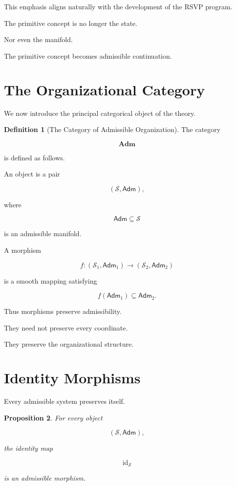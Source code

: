 \documentclass[11pt,oneside]{book}
\numberwithin{equation}{chapter}
\theoremstyle{definition}
\newtheorem{definition}{Definition}[chapter]
\theoremstyle{plain}
\newtheorem{proposition}[definition]{Proposition}
\DeclareMathOperator{\id}{id}
\newcommand{\State}{\mathcal{S}}
\newcommand{\Adm}{\mathsf{Adm}}
\begin{document}
This emphasis aligns naturally with the development of the RSVP program.

The primitive concept is no longer the state.

Nor even the manifold.

The primitive concept becomes admissible continuation.

\section{The Organizational Category}

We now introduce the principal categorical object of the theory.

\begin{definition}[The Category of Admissible Organization]

The category

\[
\mathbf{Adm}
\]

is defined as follows.

An object is a pair

\[
(\State,\Adm),
\]

where

\[
\Adm
\subseteq
\State
\]

is an admissible manifold.

A morphism

\[
f:
(\State_1,\Adm_1)
\rightarrow
(\State_2,\Adm_2)
\]

is a smooth mapping satisfying

\[
f(\Adm_1)
\subseteq
\Adm_2.
\]

\end{definition}

Thus morphisms preserve admissibility.

They need not preserve every coordinate.

They preserve the organizational structure.

\section{Identity Morphisms}

Every admissible system preserves itself.

\begin{proposition}

For every object

\[
(\State,\Adm),
\]

the identity map

\[
\id_{\State}
\]

is an admissible morphism.

\end{proposition}
\end{document}
